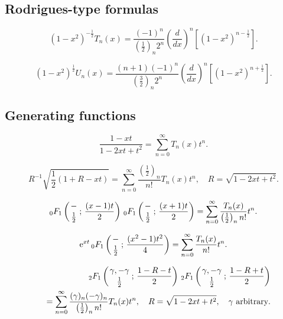 \documentclass[envcountchap,graybox]{svmono}
\newcommand{\hyp}[5]{\mbox{}_{#1}{F}_{#2}
\left(\genfrac{}{}{0pt}{}{#3}{#4}\,;\,#5\right)}
\newcommand{\e}{\textrm{e}}
\newcommand{\hyp}[5]{\,\mbox{}_{#1}F_{#2}\!\left(
  \genfrac{}{}{0pt}{}{#3}{#4};#5\right)}
\begin{document}
\subsection*{Rodrigues-type formulas}
\begin{equation}
\label{RodChebyshevI}
(1-x^2)^{-\frac{1}{2}}T_n(x)=\frac{(-1)^n}{(\frac{1}{2})_n2^n}
\left(\frac{d}{dx}\right)^n\left[(1-x^2)^{n-\frac{1}{2}}\right].
\end{equation}

\begin{equation}
\label{RodChebyshevII}
(1-x^2)^{\frac{1}{2}}U_n(x)=\frac{(n+1)(-1)^n}{(\frac{3}{2})_n2^n}
\left(\frac{d}{dx}\right)^n\left[(1-x^2)^{n+\frac{1}{2}}\right].
\end{equation}

\subsection*{Generating functions}
\begin{equation}
\label{GenChebyshevI1}
\frac{1-xt}{1-2xt+t^2}=\sum_{n=0}^{\infty}T_n(x)t^n.
\end{equation}

\begin{equation}
\label{GenChebyshevI2}
R^{-1}\sqrt{\frac{1}{2}(1+R-xt)}=\sum_{n=0}^{\infty}
\frac{\left(\frac{1}{2}\right)_n}{n!}T_n(x)t^n,\quad R=\sqrt{1-2xt+t^2}.
\end{equation}

\begin{equation}
\label{GenChebyshevI3}
\hyp{0}{1}{-}{\frac{1}{2}}{\frac{(x-1)t}{2}}\,
\hyp{0}{1}{-}{\frac{1}{2}}{\frac{(x+1)t}{2}}=
\sum_{n=0}^{\infty}\frac{T_n(x)}{\left(\frac{1}{2}\right)_nn!}t^n.
\end{equation}

\begin{equation}
\label{GenChebyshevI4}
\e^{xt}\,\hyp{0}{1}{-}{\frac{1}{2}}{\frac{(x^2-1)t^2}{4}}=
\sum_{n=0}^{\infty}\frac{T_n(x)}{n!}t^n.
\end{equation}

\begin{eqnarray}
\label{GenChebyshevI5}
& &\hyp{2}{1}{\gamma,-\gamma}{\frac{1}{2}}{\frac{1-R-t}{2}}\,
\hyp{2}{1}{\gamma,-\gamma}{\frac{1}{2}}{\frac{1-R+t}{2}}\nonumber\\
& &{}=\sum_{n=0}^{\infty}\frac{(\gamma)_n(-\gamma)_n}{\left(\frac{1}{2}\right)_nn!}T_n(x)t^n,
\quad R=\sqrt{1-2xt+t^2},\quad\textrm{$\gamma$ arbitrary}.
\end{eqnarray}
\end{document}
